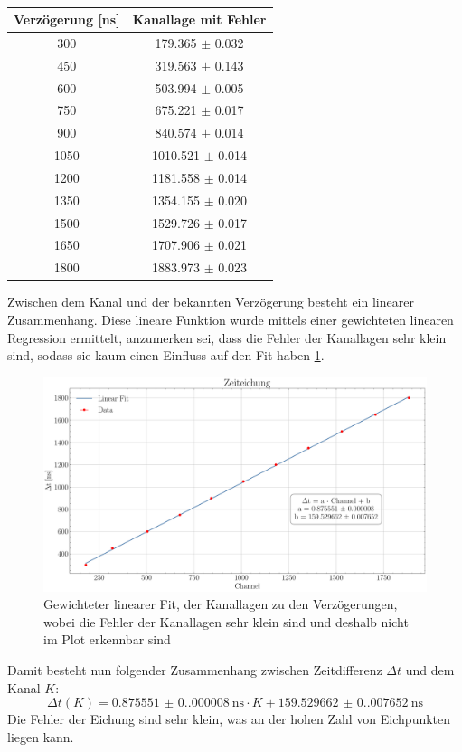 \documentclass[12pt,a4paper,ngerman]{report}
\begin{document}
	\begin{table}[]
		\centering
		\begin{tabular}{cc}
			\toprule[1.5pt]
			Verzögerung [\si{\nano \s}] & Kanallage mit Fehler\\ 
			\midrule
			300	 & 179.365 $\pm$ 0.032 \\
			450	 & 319.563 $\pm$ 0.143 \\
			600	 & 503.994 $\pm$ 0.005 \\
			750	 & 675.221 $\pm$ 0.017 \\
			900	 & 840.574 $\pm$ 0.014 \\
			1050	 & 1010.521 $\pm$ 0.014 \\
			1200	 & 1181.558 $\pm$ 0.014 \\
			1350	 & 1354.155 $\pm$ 0.020 \\
			1500	 & 1529.726 $\pm$ 0.017 \\
			1650	 & 1707.906 $\pm$ 0.021 \\
			1800	 & 1883.973 $\pm$ 0.023 \\

			
			\bottomrule[1.5pt]
		\end{tabular}
		\caption{}
		\label{table:TimeFits}
	\end{table}
	Zwischen dem Kanal und der bekannten Verzögerung besteht ein linearer Zusammenhang. Diese lineare Funktion wurde mittels einer gewichteten linearen Regression ermittelt, anzumerken sei, dass die Fehler der Kanallagen sehr klein sind, sodass sie kaum einen Einfluss auf den Fit haben \ref{img:timeLinearFit}.
	\begin{figure}[ht]
		\centering
		\includegraphics[width=\textwidth]{Bilder/timeLinearFit.pdf}		
		\caption[linearer Fit der Kanallagen]{Gewichteter linearer Fit, der Kanallagen zu den Verzögerungen, wobei die Fehler der Kanallagen sehr klein sind und deshalb nicht im Plot erkennbar sind}
		\label{img:timeLinearFit}
	\end{figure}
	Damit besteht nun folgender Zusammenhang zwischen Zeitdifferenz $\Delta t$ und dem Kanal $K$:
	\begin{equation}
		\Delta t(K) = \SI{0.875551(0.000008)}{\nano \s} \cdot K + \SI{159.529662(0.007652)}{\nano \s}
	\end{equation}
	Die Fehler der Eichung sind sehr klein, was an der hohen Zahl von Eichpunkten liegen kann.
\end{document}
